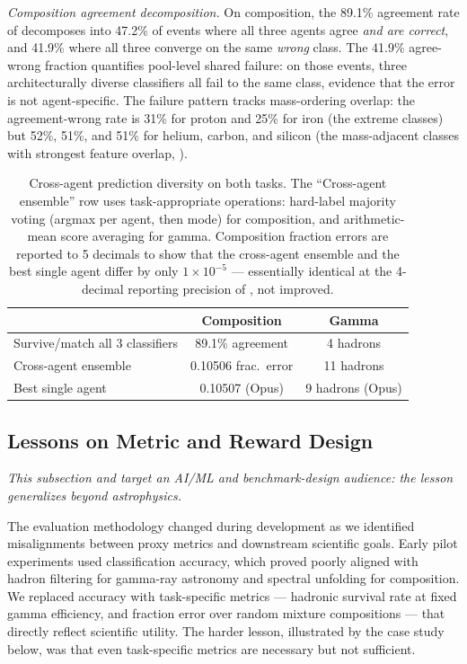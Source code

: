 \documentclass[universe,article,submit,pdftex,oneauthor]{Definitions/mdpi}
\begin{document}
\textit{Composition agreement decomposition.} On composition, the 89.1\% agreement rate of  decomposes into 47.2\% of events where all three agents agree \emph{and are correct}, and 41.9\% where all three converge on the same \emph{wrong} class. The 41.9\% agree-wrong fraction quantifies pool-level shared failure: on those events, three architecturally diverse classifiers all fail to the same class, evidence that the error is not agent-specific. The failure pattern tracks mass-ordering overlap: the agreement-wrong rate is 31\% for proton and 25\% for iron (the extreme classes) but 52\%, 51\%, and 51\% for helium, carbon, and silicon (the mass-adjacent classes with strongest feature overlap, ).

\begin{table}[H]
\caption{Cross-agent prediction diversity on both tasks. The ``Cross-agent ensemble'' row uses task-appropriate operations: hard-label majority voting (argmax per agent, then mode) for composition, and arithmetic-mean score averaging for gamma. Composition fraction errors are reported to 5 decimals to show that the cross-agent ensemble and the best single agent differ by only $1 \times 10^{-5}$ --- essentially identical at the 4-decimal reporting precision of , not improved.\label{tab:overlap}}
\begin{tabularx}{\textwidth}{lCC}
\toprule
& \textbf{Composition} & \textbf{Gamma} \\
\midrule
Survive/match all 3 classifiers & 89.1\% agreement & 4 hadrons \\
Cross-agent ensemble & 0.10506 frac.\ error & 11 hadrons \\
Best single agent & 0.10507 (Opus) & 9 hadrons (Opus) \\
\bottomrule
\end{tabularx}
\end{table}

\subsection{Lessons on Metric and Reward Design}
\label{sec:metric_lessons}

\emph{This subsection and  target an AI/ML and benchmark-design audience: the lesson generalizes beyond astrophysics.}

The evaluation methodology changed during development as we identified misalignments between proxy metrics and downstream scientific goals. Early pilot experiments used classification accuracy, which proved poorly aligned with hadron filtering for gamma-ray astronomy and spectral unfolding for composition. We replaced accuracy with task-specific metrics --- hadronic survival rate at fixed gamma efficiency, and fraction error over random mixture compositions --- that directly reflect scientific utility. The harder lesson, illustrated by the case study below, was that even task-specific metrics are necessary but not sufficient.
\end{document}
